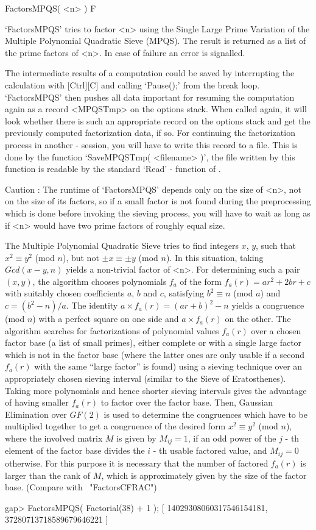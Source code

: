 
\>FactorsMPQS( <n> ) F

`FactorsMPQS' tries to factor <n> using the Single Large Prime
Variation of the Multiple Polynomial Quadratic Sieve (MPQS).
The result is returned as a list of the prime factors of <n>.
In case of failure an error is signalled.

The intermediate results of a computation could be saved by
interrupting the calculation with [Ctrl][C] and calling `Pause();'
from the break loop. `FactorsMPQS' then pushes all data important
for resuming the computation again as a record <MPQSTmp>
on the options stack. When called again, it will look whether
there is such an appropriate record on the options stack
and get the previously computed factorization data, if so. 
For continuing the factorization process in another 
{\GAP} - session, you will have to write this record to a file.
This is done by the function `SaveMPQSTmp( <filename> )',
the file written by this function is readable by the 
standard `Read' - function of {\GAP}.

Caution : The runtime of `FactorsMPQS' depends only on the size of <n>, 
not on the size of its factors, so if a small factor is not found during
the preprocessing which is done before invoking the sieving process,
you will have to wait as long as if <n> would have two prime factors
of roughly equal size.

The Multiple Polynomial Quadratic Sieve
tries to find integers $x$, $y$, such that $x^2 \equiv y^2$ (mod $n$),
but not $\pm x \equiv \pm y$ (mod $n$). In this situation,
taking $Gcd(x - y,n)$ yields a non-trivial factor of <n>.
For determining such a pair $(x,y)$, the algorithm chooses polynomials
$f_a$ of the form $f_a(r) = ar^2 + 2br + c$ with suitably chosen
coefficients $a$, $b$ and $c$, satisfying $b^2 \equiv n$ (mod $a$)
and $c = (b^2 - n)/a$.
The identity $a \times f_a(r) = (ar + b)^2 - n$ yields a congruence
(mod $n$) with a perfect square on one side and $a \times f_a(r)$ on
the other. The algorithm searches for factorizations of polynomial values 
$f_a(r)$ over a chosen factor base (a list of small primes),
either complete or with a single large factor which is not in the
factor base (where the latter ones are only usable if a second $f_a(r)$
with the same ``large factor'' is found) using a sieving technique over
an appropriately chosen
sieving interval 
(similar to the Sieve of Eratosthenes).
Taking more polynomials and hence shorter sieving intervals gives
the advantage of having smaller $f_a(r)$ to factor over the factor base.
Then, Gaussian Elimination over $GF(2)$ is used to determine the
congruences which have to be multiplied together to get a congruence
of the desired form $x^2 \equiv y^2$ (mod $n$), where the involved 
matrix $M$ is given by $M_{ij} = 1$, if an odd power of the $j$ - th 
element of the factor base divides the $i$ - th usable factored
value, and $M_{ij} = 0$ otherwise.
For this purpose it is necessary that the number of factored 
$f_a(r)$ is larger than the rank of $M$, which is approximately
given by the size of the factor base.
(Compare with ~"FactorsCFRAC")

\beginexample
gap> FactorsMPQS( Factorial(38) + 1 );
[ 14029308060317546154181, 37280713718589679646221 ]
\endexample

